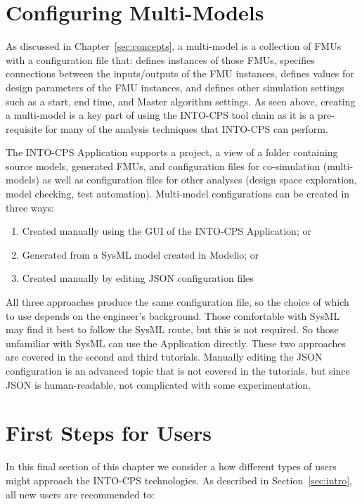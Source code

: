 \newpage
\section{Configuring Multi-Models}

As discussed in Chapter~\ref{sec:concepts}, a multi-model  is a collection of FMUs with a configuration file that: defines instances of those FMUs, specifies connections between the inputs/outputs of the FMU instances, defines values for design parameters of the FMU instances, and defines other simulation settings such as a start, end time, and Master algorithm settings. As seen above, creating a multi-model is a key part of using the INTO-CPS tool chain as it is a pre-requisite for many of the analysis techniques that INTO-CPS can perform.

The INTO-CPS Application supports a project, a view of a folder containing source models, generated FMUs, and configuration files for co-simulation (multi-models) as well as configuration files for other analyses (design space exploration, model checking, test automation). Multi-model configurations can be created in three ways:

\begin{enumerate}[noitemsep]
  \item Created manually using the GUI of the INTO-CPS Application; or
  \item Generated from a SysML model created in Modelio; or
  \item Created manually by editing JSON configuration files
\end{enumerate}

All three approaches produce the same configuration file, so the choice of which to use depends on the engineer's background. Those comfortable with SysML may find it best to follow the SysML route, but this is not required. So those unfamiliar with SysML can use the Application directly.
These two approaches are covered in the second and third tutorials. Manually editing the JSON configuration is an advanced topic that is not covered in the tutorials, but since JSON is human-readable, not complicated with some experimentation.

\section{First Steps for Users}

In this final section of this chapter we consider a how different types of users might approach the INTO-CPS technologies. As described in Section~\ref{sec:intro}, all new users are recommended to:

